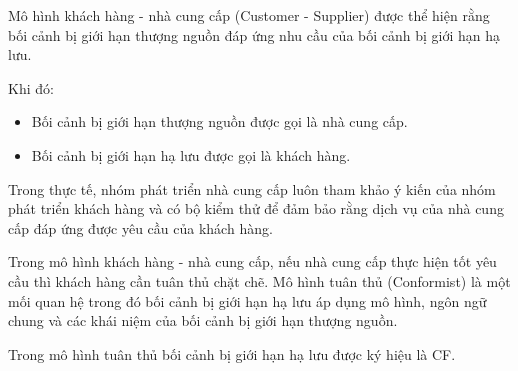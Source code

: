 
Mô hình khách hàng - nhà cung cấp (Customer - Supplier) được thể hiện rằng bối cảnh bị giới hạn thượng nguồn đáp ứng nhu cầu của bối cảnh bị giới hạn hạ lưu.

Khi đó:

\begin{itemize}

    \item Bối cảnh bị giới hạn thượng nguồn được gọi là nhà cung cấp.

    \item Bối cảnh bị giới hạn hạ lưu được gọi là khách hàng.

\end{itemize}

Trong thực tế, nhóm phát triển nhà cung cấp luôn tham khảo ý kiến của nhóm phát triển khách hàng và có bộ kiểm thử để đảm bảo rằng dịch vụ của nhà cung cấp đáp ứng được yêu cầu của khách hàng.


Trong mô hình khách hàng - nhà cung cấp, nếu nhà cung cấp thực hiện tốt yêu cầu thì khách hàng cần tuân thủ chặt chẽ. Mô hình tuân thủ (Conformist) là một mối quan hệ trong đó bối cảnh bị giới hạn hạ lưu áp dụng mô hình, ngôn ngữ chung và các khái niệm của bối cảnh bị giới hạn thượng nguồn.

Trong mô hình tuân thủ bối cảnh bị giới hạn hạ lưu được ký hiệu là CF.











